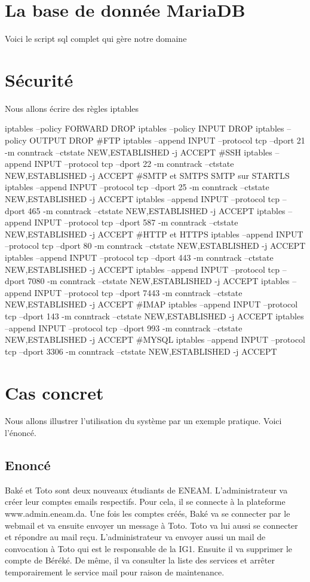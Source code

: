 \documentclass[a4paper,12pt,french]{report} %
\begin{document}
\section{La base de donnée MariaDB}
Voici le script sql complet qui gère notre domaine
\section{ Sécurité}
Nous allons écrire des règles iptables 
\begin{exempleConsole}
iptables --policy FORWARD DROP
iptables --policy INPUT  DROP
iptables --policy OUTPUT  DROP
#FTP
iptables --append INPUT --protocol tcp --dport 21 -m conntrack --ctstate NEW,ESTABLISHED -j ACCEPT
#SSH
iptables --append INPUT --protocol tcp --dport 22 -m conntrack --ctstate NEW,ESTABLISHED -j ACCEPT
#SMTP et SMTPS SMTP sur STARTLS
iptables --append INPUT --protocol tcp --dport 25 -m conntrack --ctstate NEW,ESTABLISHED -j ACCEPT
iptables --append INPUT --protocol tcp --dport 465 -m conntrack --ctstate NEW,ESTABLISHED -j ACCEPT
iptables --append INPUT --protocol tcp --dport 587 -m conntrack --ctstate NEW,ESTABLISHED -j ACCEPT
#HTTP et HTTPS
iptables --append INPUT --protocol tcp --dport 80 -m conntrack --ctstate NEW,ESTABLISHED -j ACCEPT
iptables --append INPUT --protocol tcp --dport 443 -m conntrack --ctstate NEW,ESTABLISHED -j ACCEPT
iptables --append INPUT --protocol tcp --dport 7080 -m conntrack --ctstate NEW,ESTABLISHED -j ACCEPT
iptables --append INPUT --protocol tcp --dport 7443 -m conntrack --ctstate NEW,ESTABLISHED -j ACCEPT
#IMAP
iptables --append INPUT --protocol tcp --dport 143 -m conntrack --ctstate NEW,ESTABLISHED -j ACCEPT
iptables --append INPUT --protocol tcp --dport 993 -m conntrack --ctstate NEW,ESTABLISHED -j ACCEPT
#MYSQL
iptables --append INPUT --protocol tcp --dport 3306 -m conntrack --ctstate NEW,ESTABLISHED -j ACCEPT

\end{exempleConsole}
\section{Cas concret}\label{ref:casConret}
Nous allons illustrer l'utilisation du système par un exemple pratique. Voici l'énoncé.
\subsection{Enoncé}
Baké et Toto sont deux nouveaux étudiants de ENEAM. L'administrateur va créer leur comptes emails respectifs. Pour cela, il se connecte à la plateforme www.admin.eneam.da. Une fois les comptes créés, Baké va se connecter par le webmail et va ensuite envoyer un message à Toto. Toto va lui aussi se connecter et répondre au mail reçu. L'administrateur va envoyer aussi un mail de convocation à Toto qui est le responsable de la IG1. Ensuite il va supprimer le compte de Béréké. De même, il va consulter la liste des services et arrêter temporairement le service mail pour raison de maintenance.
\end{document}
